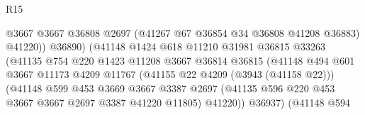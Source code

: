 \begin{lexlean}{R15}
\begin{coremodule}
                                            @3667
                                            @3667
                                            @36808
                                            @2697
                                            (@41267 @67 @36854 @34 @36808 @41208 @36883)
                                            @41220))
                                        @36890)
                                      (@41148
                                        @1424
                                        @618
                                        @11210
                                        @31981
                                        @36815
                                        @33263
                                        (@41135
                                          @754
                                          @220
                                          @1423
                                          @11208
                                          @3667
                                          @36814
                                          @36815
                                          (@41148
                                            @494
                                            @601
                                            @3667
                                            @11173
                                            @4209
                                            @11767
                                            (@41155 @22 @4209 (@3943 (@41158 @22)))
                                            (@41148
                                              @599
                                              @453
                                              @3669
                                              @3667
                                              @3387
                                              @2697
                                              (@41135
                                                @596
                                                @220
                                                @453
                                                @3667
                                                @3667
                                                @2697
                                                @3387
                                                @41220
                                                @11805)
                                              @41220))
                                          @36937)
                                        (@41148
                                          @594

\end{coremodule}
\end{lexlean}
